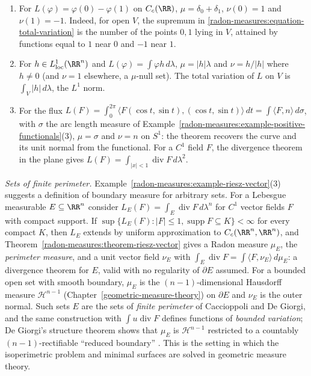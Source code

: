 \begin{example}\label{radon-measures:example-riesz-vector}
\begin{enumerate}
\item For $L(\varphi) = \varphi(0) - \varphi(1)$ on $C_c(\RR)$, $\mu = \delta_0 + \delta_1$, $\nu(0) = 1$ and $\nu(1) = -1$. Indeed, for open $V$, the supremum in
\eqref{radon-measures:equation-total-variation} is the number of the points $0, 1$ lying in $V$, attained by functions equal to $1$ near $0$ and $-1$ near $1$.
\item For $h \in L^1_{\mathrm{loc}}(\RR^n)$ and $L(\varphi) = \int\varphi h\,d\lambda$, $\mu = |h|\lambda$ and $\nu = h/|h|$ where $h \neq 0$ (and $\nu = 1$ elsewhere, a $\mu$-null set). The total variation of
$L$ on $V$ is $\int_V|h|\,d\lambda$, the $L^1$ norm.
\item For the flux $L(F) = \int_0^{2\pi}\langle F(\cos t, \sin t), (\cos t, \sin t)\rangle\,dt = \int\langle F, n\rangle\,d\sigma$, with $\sigma$ the arc length measure of
Example~\ref{radon-measures:example-positive-functionals}(3), $\mu = \sigma$ and $\nu = n$ on $S^1$: the theorem recovers the curve and its unit normal from the functional.
For a $C^1$ field $F$, the divergence theorem in the plane gives $L(F) = \int_{|x| < 1}\operatorname{div}F\,d\lambda^2$.
\end{enumerate}
\end{example}

\begin{remark}\label{radon-measures:remark-perimeter}
\emph{Sets of finite perimeter.} Example~\ref{radon-measures:example-riesz-vector}(3) suggests a definition of boundary measure for arbitrary sets. For a Lebesgue measurable $E \subseteq \RR^n$ consider
$L_E(F) = \int_E\operatorname{div}F\,d\lambda^n$ for $C^1$ vector fields $F$ with compact support. If $\sup\{L_E(F) : |F| \leq 1, \operatorname{supp}F \subseteq K\} < \infty$ for every compact $K$, then $L_E$ extends
by uniform approximation to $C_c(\RR^n, \RR^n)$, and Theorem~\ref{radon-measures:theorem-riesz-vector} gives a Radon measure $\mu_E$, the \emph{perimeter measure}, and a unit vector field $\nu_E$ with
$\int_E\operatorname{div}F = \int\langle F, \nu_E\rangle\,d\mu_E$: a divergence theorem for $E$, valid with no regularity of $\partial E$ assumed. For a bounded open set with smooth boundary, $\mu_E$ is the
$(n-1)$-dimensional Hausdorff measure $\mathcal{H}^{n-1}$ (Chapter~\ref{geometric-measure-theory}) on $\partial E$ and $\nu_E$ is the outer normal. Such sets $E$ are the sets of \emph{finite perimeter} of Caccioppoli and De Giorgi, and the same construction with $\int u\operatorname{div}F$
defines functions of \emph{bounded variation}; De Giorgi's structure theorem shows that $\mu_E$ is $\mathcal{H}^{n-1}$ restricted to a countably $(n-1)$-rectifiable ``reduced boundary''
\cite[Chapter 5]{evans-gariepy}. This is the setting in which the isoperimetric problem and minimal surfaces are solved in geometric measure theory.
\end{remark}

